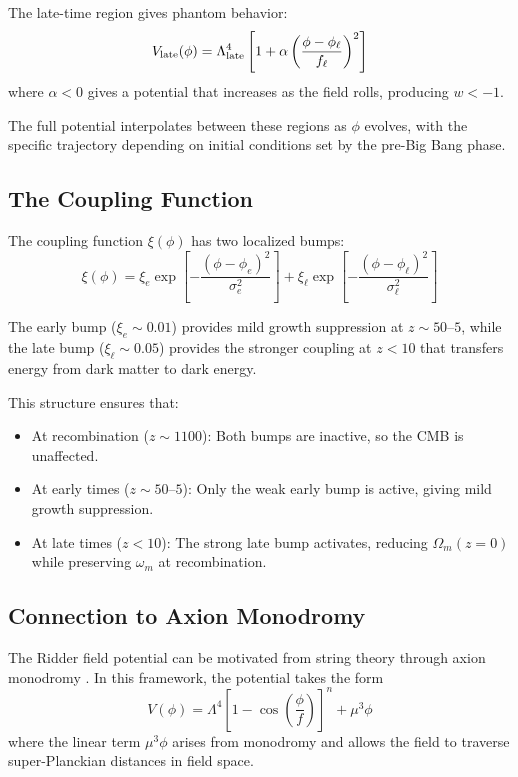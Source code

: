 \documentclass[twocolumn,showpacs,preprintnumbers,amsmath,amssymb,prd]{revtex4-2}
\begin{document}
The late-time region gives phantom behavior:
\begin{equation}
V_{\rm late}(\phi) = \Lambda_{\rm late}^4 \left[1 + \alpha\left(\frac{\phi - \phi_\ell}{f_\ell}\right)^2\right]
\end{equation}
where $\alpha < 0$ gives a potential that increases as the field rolls, producing $w < -1$.

The full potential interpolates between these regions as $\phi$ evolves, with the specific trajectory depending on initial conditions set by the pre-Big Bang phase.

\subsection{The Coupling Function}

The coupling function $\xi(\phi)$ has two localized bumps:
\begin{equation}
\xi(\phi) = \xi_e \exp\left[-\frac{(\phi - \phi_e)^2}{\sigma_e^2}\right] + \xi_\ell \exp\left[-\frac{(\phi - \phi_\ell)^2}{\sigma_\ell^2}\right]
\label{eq:coupling}
\end{equation}

The early bump ($\xi_e \sim 0.01$) provides mild growth suppression at $z \sim 50$--$5$, while the late bump ($\xi_\ell \sim 0.05$) provides the stronger coupling at $z < 10$ that transfers energy from dark matter to dark energy.

This structure ensures that:
\begin{itemize}
    \item At recombination ($z \sim 1100$): Both bumps are inactive, so the CMB is unaffected.
    \item At early times ($z \sim 50$--$5$): Only the weak early bump is active, giving mild growth suppression.
    \item At late times ($z < 10$): The strong late bump activates, reducing $\Omega_m(z=0)$ while preserving $\omega_m$ at recombination.
\end{itemize}

\subsection{Connection to Axion Monodromy}

The Ridder field potential can be motivated from string theory through axion monodromy \cite{Silverstein2008,McAllister2010}. In this framework, the potential takes the form
\begin{equation}
V(\phi) = \Lambda^4\left[1 - \cos\left(\frac{\phi}{f}\right)\right]^n + \mu^3\phi
\end{equation}
where the linear term $\mu^3\phi$ arises from monodromy and allows the field to traverse super-Planckian distances in field space.
\end{document}
